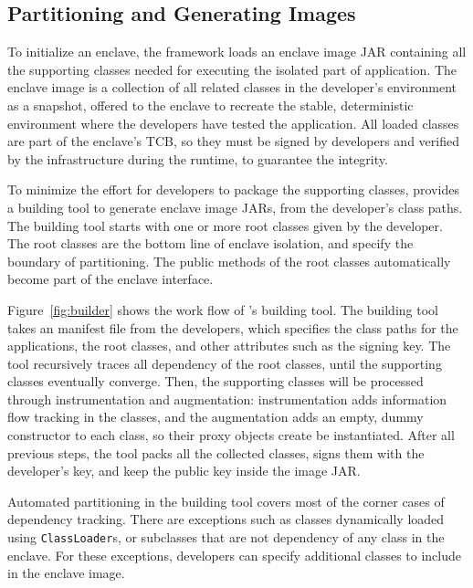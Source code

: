 \subsection{Partitioning and Generating Images}

To initialize an enclave, the \sysname{} framework
loads an enclave image JAR containing all the supporting classes needed
for executing the isolated part of application.
The enclave image is a collection of all related classes in the developer's
environment as a snapshot, offered to the enclave
to recreate the stable, deterministic environment where the
developers have tested the application.
All loaded classes are part of the enclave's TCB,
so they must be signed by developers and verified by the infrastructure
during the runtime, to guarantee the integrity.

To minimize the effort for developers to package the supporting classes,
\sysname{} provides a building tool
to generate enclave image JARs,
from the developer's class paths.
The building tool
starts with one or more root classes given by the developer.
The root classes are the bottom line of enclave isolation,
and specify the boundary of partitioning.
The public methods of the root classes automatically
become part of the enclave interface.


Figure~\ref{fig:builder} shows the work flow of \sysname{}'s building tool.
The building tool takes an manifest file from the developers,
which specifies the class paths for the applications,
the root classes, and other attributes such as the signing key.
The tool recursively traces all dependency of the root classes,
until the supporting classes eventually converge.
Then, the supporting classes will be processed through
instrumentation and augmentation:
instrumentation adds information flow tracking in the classes,
and the augmentation adds an empty, dummy constructor to each class,
so their proxy objects create be instantiated.
After all previous steps, the tool packs all the collected classes,
signs them with the developer's key, and keep the public key
inside the image JAR. 

Automated partitioning in the \sysname{} building tool
covers most of the corner cases of dependency tracking.
There are exceptions such as
classes dynamically loaded using {\tt ClassLoader}s,
or subclasses that are not dependency of any class in the enclave.
For these exceptions,
developers can specify additional classes to include in the enclave image.

